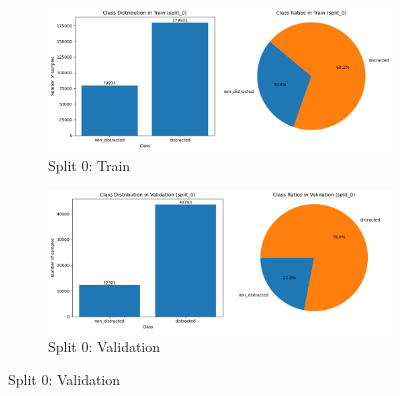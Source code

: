 \begin{figure}[htbp]
    \centering
    \begin{subfigure}[b]{0.45\textwidth}
        \includegraphics[width=\textwidth]{Images_Thesis/class_distribution_Kinect_color/split_0_rgb_daa/class_dist_train_sp_0_rgb_daa.png}
        \caption{Split 0: Train}
        \label{fig:Class_dist_grid_image1}
    \end{subfigure}
    \hfill %
    \begin{subfigure}[b]{0.45\textwidth}
        \includegraphics[width=\textwidth]{Images_Thesis/class_distribution_Kinect_color/split_0_rgb_daa/class_dist_val_sp_0_rgb_daa.png}
        \caption{Split 0: Validation}
        \label{fig:Class_dist_grid_image2}
    \end{subfigure}


\end{figure}
